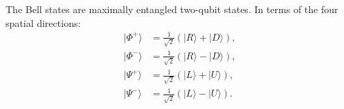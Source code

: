 The Bell states are maximally entangled two-qubit states. In terms of
the four spatial directions:
\begin{align}
  |\Phi^+\rangle &= \frac{1}{\sqrt{2}}(|R\rangle + |D\rangle), \\
  |\Phi^-\rangle &= \frac{1}{\sqrt{2}}(|R\rangle - |D\rangle), \\
  |\Psi^+\rangle &= \frac{1}{\sqrt{2}}(|L\rangle + |U\rangle), \\
  |\Psi^-\rangle &= \frac{1}{\sqrt{2}}(|L\rangle - |U\rangle).
\end{align}
